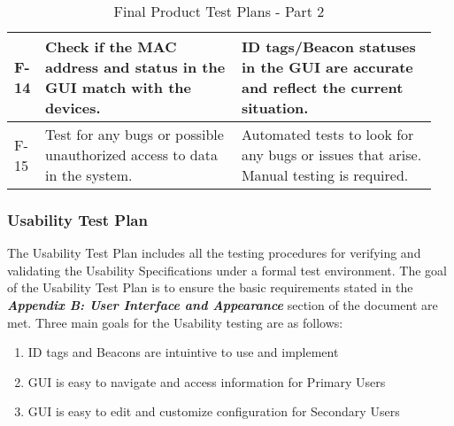 \begin{table}[h!]
\begin{tabular}{|m{0.05\linewidth}|m{0.45\linewidth}|m{0.45\linewidth}|}
    F-14
    & Check if the MAC address and status in the GUI match with the devices.
    & ID tags/Beacon statuses in the GUI are accurate and reflect the current situation.  \\ 
    \hline

    F-15
    & Test for any bugs or possible unauthorized access to data in the system.
    & Automated tests to look for any bugs or issues that arise. Manual testing is required.  \\ 
    \hline


\end{tabular}
	\caption{Final Product Test Plans - Part 2}
\end{table}



\pagebreak
\subsubsection{Usability Test Plan}
\medskip
The Usability Test Plan includes all the testing procedures for verifying and validating the Usability Specifications under a 
formal test environment. The goal of the Usability Test Plan is to ensure the basic requirements stated in the 
\textbf{\textit{Appendix B: User Interface and Appearance}} section of the document are met. Three main goals for the Usability testing are as follows:
\begin{enumerate}
    \item ID tags and Beacons are intuintive to use and implement
    \item GUI is easy to navigate and access information for Primary Users
    \item GUI is easy to edit and customize configuration for Secondary Users
\end{enumerate} 

